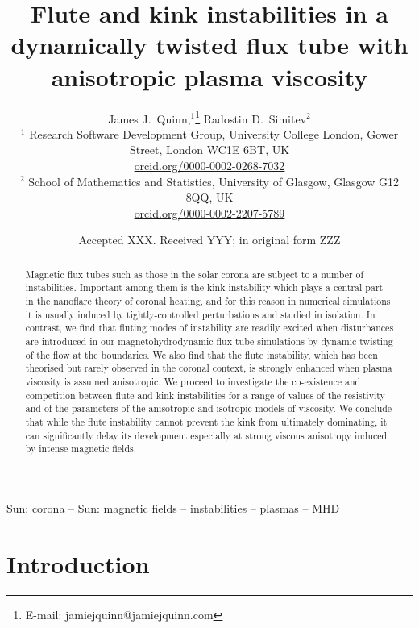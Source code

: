 \documentclass[fleqn,usenatbib]{mnras}
\title{Flute and kink instabilities in a dynamically twisted
    flux tube with anisotropic plasma viscosity}
\author[J.~Quinn and R.~Simitev]{
James J.~Quinn,$^{1}$\thanks{E-mail: jamiejquinn@jamiejquinn.com}
Radostin D.~Simitev$^{2}$
\\
$^{1}$ Research Software Development Group, University College London, Gower Street, London WC1E 6BT, UK \\
\href{https://orcid.org/0000-0002-0268-7032}{orcid.org/0000-0002-0268-7032} \\
$^2$ School of Mathematics and Statistics, University of Glasgow,
Glasgow G12 8QQ,
UK \\ \href{https://orcid.org/0000-0002-2207-5789}{orcid.org/0000-0002-2207-5789}\\
}
\date{Accepted XXX. Received YYY; in original form ZZZ}
\begin{document}
\label{firstpage}
\pagerange{\pageref{firstpage}--\pageref{lastpage}}
\maketitle


\graphicspath{{images/kink_instability_straight/}}

\begin{abstract}
Magnetic flux tubes such as those in the solar corona are subject to a number
of instabilities. Important among them is the kink instability which plays
a central part in the nanoflare theory of coronal heating, and for this reason
in numerical simulations it is usually induced by tightly-controlled
perturbations and studied in isolation. In contrast, we find that
fluting modes of instability are readily excited when disturbances are
introduced in our magnetohydrodynamic flux tube simulations by dynamic
twisting of the flow at the boundaries. We also find that the flute instability, which has been 
theorised but rarely observed in the coronal context,  is strongly enhanced
when plasma viscosity is assumed anisotropic. We proceed to investigate the
co-existence and competition between flute and kink instabilities for a range
of values of the resistivity and of the parameters of the anisotropic and
isotropic models of viscosity. We conclude that while the flute instability
cannot prevent the kink from ultimately dominating, it can significantly delay
its development especially at strong viscous anisotropy induced by intense
magnetic fields.
\end{abstract}

\begin{keywords}
Sun: corona -- Sun: magnetic fields -- instabilities -- plasmas -- MHD
\end{keywords}

\section{Introduction}



\end{document}
